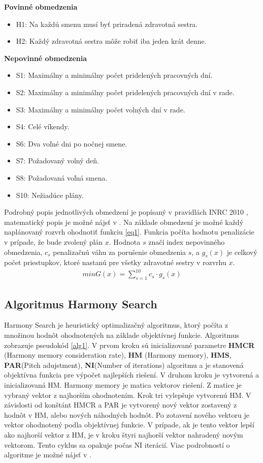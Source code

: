\documentclass[a4paper, 14pt]{article}
\begin{document}
\newpage
\textbf{Povinné obmedzenia}
\begin{itemize}
\item H1: Na každú smenu musí byť priradená zdravotná sestra.
\item H2: Každý zdravotná sestra môže robiť iba jeden krát denne.
\end{itemize}
\par\textbf{Nepovinné obmedzenia}
\begin{itemize}
\item S1: Maximálny a minimálny počet pridelených pracovných dní.
\item S2: Maximálny a minimálny počet pridelených pracovných dní v rade.
\item S3: Maximálny a minimálny počet volných dní v rade.
\item S4: Celé víkendy.
\item S6: Dva voľné dni po nočnej smene.
\item S7: Požadovaný volný deň.
\item S8: Požadovaná voľná smena.
\item S10: Nežiadúce plány.
\end{itemize}
Podrobný popis jednotlivých obmedzení je popísaný v pravidlách INRC 2010 \cite{Pravidla}, matematický popis je možné nájsť v \cite{MathArticle}. Na základe obmedzení je možné každý naplánovaný rozvrh ohodnotiť funkciu \ref{eq1}. Funkcia počíta hodnotu penalizácie v prípade, že bude zvolený plán $x$. Hodnota $s$ značí index nepovinného obmedzenia, $c_s$ penalizačnú váhu za porušenie obmedzenia $s$, a $g_s(x)$ je celkový počet priestupkov, ktoré nastanú pre všetky zdravotné sestry v rozvrhu  $x$. 
\begin{eqnarray}
\label{eq1}
min G(x) = {\sum_{s=1}^{10} c_s \cdot g_s(x)}
\end{eqnarray}

\subsection{Algoritmus Harmony Search}
\label{sec:sectionHSalg}
Harmony Search je heuristický optimalizačný algoritmus, ktorý počíta z množinou hodnôt ohodnotených na základe objektívnej funkcie. Algoritmus zobrazuje pseudokód \ref{alg1}. V prvom kroku sú inicializované parametre \textbf{HMCR} (Harmony memory consideration rate), \textbf{HM} (Harmony memory), \textbf{HMS}, \textbf{PAR}(Pitch adujstment), \textbf{NI}(Number of iterations) algoritmu a je stanovená objektívna funkcia pre výpočet najlepších riešení. V druhom kroku je vytvorená a inicializovaná HM. Harmony memory je matica vektorov riešení. Z matice je vybraný vektor z najhorším ohodnotením. Krok tri vylepšuje vytvorenú HM. V závislosti od konštánt HMCR a PAR je vytvorený nový vektor zostavený z hodnôt v HM, alebo nových náhodných hodnôt. Po zotavení nového vektoru je vektor ohodnotený podla objektívnej funkcie. V prípade, ak je tento vektor lepší ako najhorší vektor z HM, je v kroku štyri najhorší vektor nahradený novým vektorom. Tento cyklus sa opakuje počas NI iterácií. Viac podrobností o algoritme je možné nájsť v \cite{MainArticle}.\\
\end{document}
